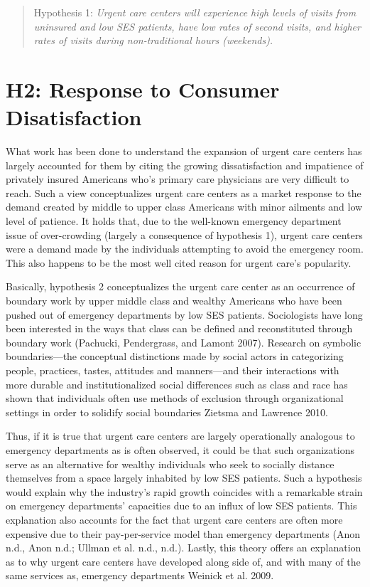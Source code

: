 \documentclass[12pt,twoside]{reedthesis}
\begin{document}
  \begin{quote}
  Hypothesis 1: \emph{Urgent care centers will experience high levels of
  visits from uninsured and low SES patients, have low rates of second
  visits, and higher rates of visits during non-traditional hours
  (weekends).}
  \end{quote}
  
  \section*{H2: Response to Consumer
  Disatisfaction}\label{h2-response-to-consumer-disatisfaction}
  
  What work has been done to understand the expansion of urgent care
  centers has largely accounted for them by citing the growing
  dissatisfaction and impatience of privately insured Americans who's
  primary care physicians are very difficult to reach. Such a view
  conceptualizes urgent care centers as a market response to the demand
  created by middle to upper class Americans with minor ailments and low
  level of patience. It holds that, due to the well-known emergency
  department issue of over-crowding (largely a consequence of hypothesis
  1), urgent care centers were a demand made by the individuals attempting
  to avoid the emergency room. This also happens to be the most well cited
  reason for urgent care's popularity.
  
  Basically, hypothesis 2 conceptualizes the urgent care center as an
  occurrence of boundary work by upper middle class and wealthy Americans
  who have been pushed out of emergency departments by low SES patients.
  Sociologists have long been interested in the ways that class can be
  defined and reconstituted through boundary work (Pachucki, Pendergrass,
  and Lamont 2007). Research on symbolic boundaries---the conceptual
  distinctions made by social actors in categorizing people, practices,
  tastes, attitudes and manners---and their interactions with more durable
  and institutionalized social differences such as class and race has
  shown that individuals often use methods of exclusion through
  organizational settings in order to solidify social boundaries Zietsma
  and Lawrence 2010.
  
  Thus, if it is true that urgent care centers are largely operationally
  analogous to emergency departments as is often observed, it could be
  that such organizations serve as an alternative for wealthy individuals
  who seek to socially distance themselves from a space largely inhabited
  by low SES patients. Such a hypothesis would explain why the industry's
  rapid growth coincides with a remarkable strain on emergency
  departments' capacities due to an influx of low SES patients. This
  explanation also accounts for the fact that urgent care centers are
  often more expensive due to their pay-per-service model than emergency
  departments (Anon n.d., Anon n.d.; Ullman et al. n.d., n.d.). Lastly,
  this theory offers an explanation as to why urgent care centers have
  developed along side of, and with many of the same services as,
  emergency departments Weinick et al. 2009.
  
\end{document}
